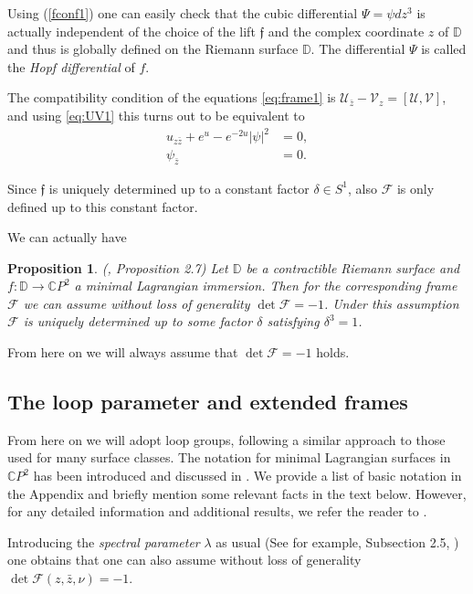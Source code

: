 \documentclass[a4paper,11pt]{amsart}
\newtheorem{proposition}[theorem]{Proposition}
\theoremstyle{definition}
\numberwithin{equation}{section}
\newcommand{\C}{\mathbb{C}}
\newcommand{\D}{\mathbb{D}}
\newcommand{\f}{\mathfrak{f}}
\begin{document}
Using (\ref{fconf1}) one can easily check that the cubic differential $\Psi=\psi dz^3$ is actually independent of the choice of the lift $\f$ and the complex coordinate $z$ of $\D$ and thus is globally defined on the Riemann surface $\D$. The differential $\Psi$ is called the \emph{Hopf differential} of $f$.


The compatibility condition of  the equations \eqref{eq:frame1} is
${\mathcal U}_{\bar z}-{\mathcal V}_z =[{\mathcal U},{\mathcal V}]$,  
and using \eqref{eq:UV1} this turns out to be equivalent to
 \begin{align}
u_{z\bar z}+e^u-e^{-2u}|\psi|^2&=0,\label{eq:mLsurfaces}\\
\psi_{\bar z}&=0.\label{eq:Codazzi}
\end{align}


Since  $\f$   is uniquely determined up to a constant factor $\delta \in S^1$,
also $\mathcal{F}$ is only defined up to this  constant factor. 

We can actually  have 

\begin{proposition} (\cite{DoMaB1}, Proposition 2.7) \label{prop:constDet}
Let $\D$ be a contractible Riemann surface  and  $f: \D \rightarrow {\mathbb C}P^2$ a minimal Lagrangian immersion. Then for the corresponding  frame $\mathcal{F}$ we can assume without loss of generality
$\det \mathcal{F} = -1$.
Under this assumption $\mathcal{F}$ is uniquely determined up to some factor $\delta$ satisfying $\delta^3 = 1$.
\end{proposition}

From here on we will always assume that $ \det \mathcal{F} = -1$ holds.
\subsection{The loop parameter and extended frames}
\label{subsec:2.3}

From here on we will adopt loop groups, following a similar approach to those used for many surface classes.
The notation for minimal Lagrangian surfaces in $\C P^2$  has been introduced and discussed in \cite{DoMaB1}.
We provide a list of basic notation in the Appendix and briefly mention some relevant facts in the text below. However, for any detailed information and additional results, we refer the reader to \cite{DoMaB1}.

Introducing the \emph{spectral parameter}  $\lambda$ as usual (See for example, Subsection 2.5, \cite{DoMaB1}) one  obtains that 
one can also assume without loss of generality  $\det \mathcal{F}(z,\bar{z}, \nu) = -1$.  
\end{document}
